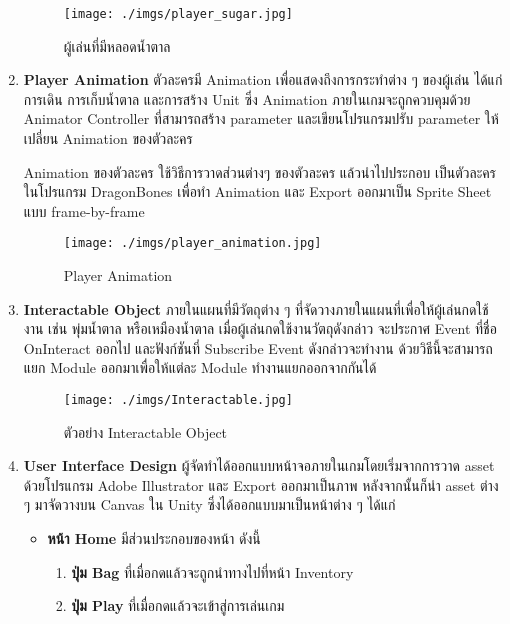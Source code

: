 \documentclass[12pt,oneside,openright,a4paper]{cpe-thai-project}
\begin{document}
\begin{enumerate}
    \begin{figure}[H]\centering
      \texttt{[image: ./imgs/player\_sugar.jpg]}
      \caption{ผู้เล่นที่มีหลอดน้ำตาล}\label{fig:4-4}
    \end{figure}

  \item \textbf{Player Animation}
    ตัวละครมี Animation เพื่อแสดงถึงการกระทำต่าง ๆ ของผู้เล่น 
    ได้แก่ การเดิน การเก็บน้ำตาล และการสร้าง Unit ซึ่ง Animation 
    ภายในเกมจะถูกควบคุมด้วย Animator Controller ที่สามารถสร้าง parameter 
    และเขียนโปรแกรมปรับ parameter ให้เปลี่ยน Animation ของตัวละคร 

    Animation ของตัวละคร ใช้วิธีการวาดส่วนต่างๆ ของตัวละคร แล้วนำไปประกอบ
    เป็นตัวละครในโปรแกรม DragonBones เพื่อทำ Animation และ Export 
    ออกมาเป็น Sprite Sheet แบบ frame-by-frame

    \begin{figure}[H]\centering
      \texttt{[image: ./imgs/player\_animation.jpg]}
      \caption{Player Animation}\label{fig:4-5}
    \end{figure}
    
  \item \textbf{Interactable Object}
    ภายในแผนที่มีวัตถุต่าง ๆ ที่จัดวางภายในแผนที่เพื่อให้ผู้เล่นกดใช้งาน 
    เช่น พุ่มน้ำตาล หรือเหมืองน้ำตาล เมื่อผู้เล่นกดใช้งานวัตถุดังกล่าว 
    จะประกาศ Event ที่ชื่อ OnInteract ออกไป และฟังก์ชันที่ Subscribe Event 
    ดังกล่าวจะทำงาน ด้วยวิธีนี้จะสามารถแยก Module ออกมาเพื่อให้แต่ละ Module ทำงานแยกออกจากกันได้

    \begin{figure}[H]\centering
      \texttt{[image: ./imgs/Interactable.jpg]}
      \caption{ตัวอย่าง Interactable Object}\label{fig:4-6}
    \end{figure}
    
  \item \textbf{User Interface Design}
    ผู้จัดทำได้ออกแบบหน้าจอภายในเกมโดยเริ่มจากการวาด asset 
    ด้วยโปรแกรม Adobe Illustrator และ Export ออกมาเป็นภาพ 
    หลังจากนั้นก็นำ asset ต่าง ๆ มาจัดวางบน Canvas ใน Unity 
    ซึ่งได้ออกแบบมาเป็นหน้าต่าง ๆ ได้แก่

    \begin{itemize}
      \item \textbf{หน้า Home} มีส่วนประกอบของหน้า ดังนี้ 
      \begin{enumerate}
        \item \textbf{ปุ่ม Bag} ที่เมื่อกดแล้วจะถูกนำทางไปที่หน้า Inventory 
        \item \textbf{ปุ่ม Play} ที่เมื่อกดแล้วจะเข้าสู่การเล่นเกม
      \end{enumerate}


\end{itemize}
\end{enumerate}
\end{document}
